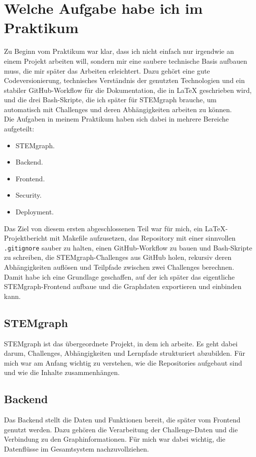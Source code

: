\section{Welche Aufgabe habe ich im Praktikum}

Zu Beginn vom Praktikum war klar, dass ich nicht einfach nur irgendwie an einem Projekt arbeiten will, sondern mir eine saubere technische Basis aufbauen muss, die mir später das Arbeiten erleichtert. Dazu gehört eine gute Codeversionierung, technisches Verständnis der genutzten Technologien und ein stabiler GitHub-Workflow für die Dokumentation, die in LaTeX geschrieben wird, und die drei Bash-Skripte, die ich später für STEMgraph brauche, um automatisch mit Challenges und deren Abhängigkeiten arbeiten zu können.
\\
Die Aufgaben in meinem Praktikum haben sich dabei in mehrere Bereiche aufgeteilt:

\begin{itemize}[itemsep=2pt]
\item STEMgraph.
\item Backend.
\item Frontend.
\item Security.
\item Deployment.
\end{itemize}
Das Ziel von diesem ersten abgeschlossenen Teil war für mich, ein LaTeX-Projektbericht mit Makefile aufzusetzen, das Repository mit einer sinnvollen \texttt{.gitignore} sauber zu halten, einen GitHub-Workflow zu bauen und Bash-Skripte zu schreiben, die STEMgraph-Challenges aus GitHub holen, rekursiv deren Abhängigkeiten auflösen und Teilpfade zwischen zwei Challenges berechnen.
Damit habe ich eine Grundlage geschaffen, auf der ich später das eigentliche STEMgraph-Frontend aufbaue und die Graphdaten exportieren und einbinden kann.
\subsection{STEMgraph}
STEMgraph ist das übergeordnete Projekt, in dem ich arbeite. Es geht dabei darum, Challenges, Abhängigkeiten und Lernpfade strukturiert abzubilden. Für mich war am Anfang wichtig zu verstehen, wie die Repositories aufgebaut sind und wie die Inhalte zusammenhängen.
\subsection{Backend}

Das Backend stellt die Daten und Funktionen bereit, die später vom Frontend genutzt werden. Dazu gehören die Verarbeitung der Challenge-Daten und die Verbindung zu den Graphinformationen. Für mich war dabei wichtig, die Datenflüsse im Gesamtsystem nachzuvollziehen.

